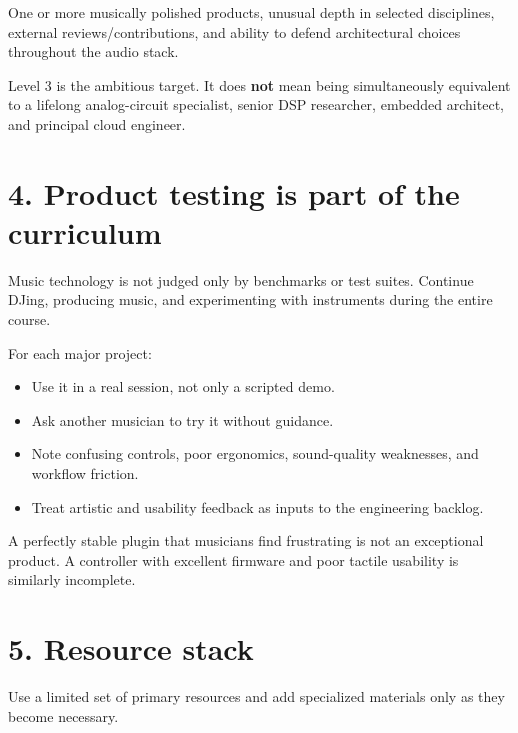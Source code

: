 \documentclass[11pt,letterpaper]{article}
\begin{document}
One or more musically polished products, unusual depth in selected disciplines, external reviews/contributions, and ability to defend architectural choices throughout the audio stack.

Level 3 is the ambitious target. It does \textbf{not} mean being simultaneously equivalent to a lifelong analog-circuit specialist, senior DSP researcher, embedded architect, and principal cloud engineer.

\section{4. Product testing is part of the curriculum}\label{product-testing-is-part-of-the-curriculum}

Music technology is not judged only by benchmarks or test suites. Continue DJing, producing music, and experimenting with instruments during the entire course.

For each major project:

\begin{itemize}
\item Use it in a real session, not only a scripted demo.
\item Ask another musician to try it without guidance.
\item Note confusing controls, poor ergonomics, sound-quality weaknesses, and workflow friction.
\item Treat artistic and usability feedback as inputs to the engineering backlog.
\end{itemize}

A perfectly stable plugin that musicians find frustrating is not an exceptional product. A controller with excellent firmware and poor tactile usability is similarly incomplete.

\clearpage
\section{5. Resource stack}\label{resource-stack}

Use a limited set of primary resources and add specialized materials only as they become necessary.
\end{document}
